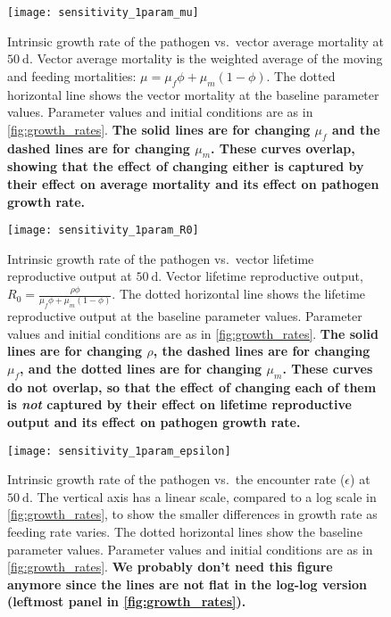 \documentclass{article}
\newcommand{\comment}[1]{\textbf{#1}}
\begin{document}
\begin{figure}
  \centering
  \texttt{[image: sensitivity\_1param\_mu]}
  \caption{Intrinsic growth rate of the pathogen vs.~vector average
    mortality at $50~\text{d}$.  Vector average mortality is the
    weighted average of the moving and feeding mortalities: $\mu =
    \mu_f \phi + \mu_m (1 - \phi)$.  The dotted horizontal
    line shows the vector mortality at the baseline parameter values.
    Parameter values and initial conditions are as in
    \autoref{fig:growth_rates}.  \comment{The solid lines are for
      changing $\mu_f$ and the dashed lines are for changing
      $\mu_m$.  These curves overlap, showing that the effect of
      changing either is captured by their effect on average mortality
      and its effect on pathogen growth rate.}}
  \label{fig:sensitivity_1param_mu}
\end{figure}

\begin{figure}
  \centering
  \texttt{[image: sensitivity\_1param\_R0]}
  \caption{Intrinsic growth rate of the pathogen vs.~vector lifetime
    reproductive output at $50~\text{d}$.  Vector lifetime
    reproductive output, $R_0 = \frac{\rho \phi}{\mu_f \phi +
      \mu_m (1 - \phi)}$.  The dotted horizontal line shows the
    lifetime reproductive output at the baseline parameter values.
    Parameter values and initial conditions are as in
    \autoref{fig:growth_rates}.  \comment{The solid lines are for
      changing $\rho$, the dashed lines are for changing $\mu_f$,
      and the dotted lines are for changing $\mu_m$.  These curves
      do not overlap, so that the effect of
      changing each of them is \emph{not} captured by their effect on
      lifetime reproductive output and its effect on pathogen growth
      rate.}}
  \label{fig:sensitivity_1param_R0}
\end{figure}

\begin{figure}
  \centering
  \texttt{[image: sensitivity\_1param\_epsilon]}
  \caption{Intrinsic growth rate of the pathogen vs.~the encounter
    rate ($\epsilon$) at $50~\text{d}$.  The vertical axis has a linear scale,
    compared to a log scale in \autoref{fig:growth_rates}, to show the
    smaller differences in growth rate as feeding rate varies.  The
    dotted horizontal lines show the baseline parameter values.
    Parameter values and initial conditions are as in
    \autoref{fig:growth_rates}.  \comment{We probably don't need this
      figure anymore since the lines are not flat in the log-log
      version (leftmost panel in \autoref{fig:growth_rates}).}}
  \label{fig:sensitivity_1param_epsilon}
\end{figure}
\end{document}
